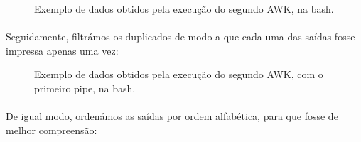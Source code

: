 \documentclass[11pt,a4paper]{report}
\begin{document}
\begin{figure}[H]
\centering
\noindent{}
\caption{Exemplo de dados obtidos pela execução do segundo AWK, na bash.}
\end{figure}

\paragraph*{}Seguidamente, filtrámos os duplicados de modo a que cada uma das saídas fosse impressa apenas uma vez:

\begin{figure}[H]
\centering
\noindent{}
\caption{Exemplo de dados obtidos pela execução do segundo AWK, com o primeiro pipe, na bash.}
\end{figure}

\paragraph*{}De igual modo, ordenámos as saídas por ordem alfabética, para que fosse de melhor compreensão:
\end{document}

